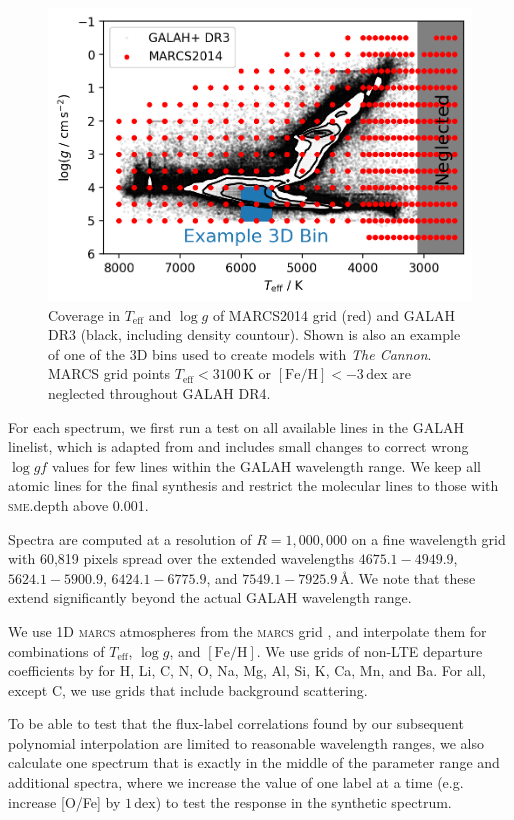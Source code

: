 \documentclass[
  journal=pasa,
  manuscript=research-paper, %
  year=2021,
  volume=37,
]{cup-journal}
\newcommand{\Teff}{$T_\mathrm{eff}$\xspace}
\newcommand{\logg}{$\log g$\xspace}
\newcommand{\feh}{$\mathrm{[Fe/H]}$\xspace}
\newcommand{\TheCannon}{\textit{The Cannon}\xspace}
\newcommand{\marcs}{\textsc{marcs}\xspace}
\newcommand{\dex}{\,\mathrm{dex}}	%
\newcommand{\K}{\,\mathrm{K}}	%
\newcommand{\Angstroem}{\,\text{\AA}}	%
\begin{document}
\begin{figure}[hbt!]
 \centering
 \includegraphics[width=\textwidth]{figures/teff_logg_grid_coverage.png}
 \caption{Coverage in \Teff and \logg of MARCS2014 grid (red) and GALAH DR3 (black, including density countour). Shown is also an example of one of the 3D bins used to create models with \TheCannon. MARCS grid points \Teff$ < 3100\K$ or \feh$<-3\dex$ are neglected throughout GALAH DR4.}
 \label{fig:teff_logg_grid_coverage}
\end{figure}

For each spectrum, we first run a test on all available lines in the GALAH linelist, which is adapted from \citet{Heiter2021} and includes small changes to correct wrong $\log gf$ values for few lines within the GALAH wavelength range. We keep all atomic lines for the final synthesis and restrict the molecular lines to those with \textsc{sme}.depth above 0.001.

Spectra are computed at a resolution of $R = 1,000,000$ on a fine wavelength grid with 60,819 pixels spread over the extended wavelengths $4675.1- 4949.9$, $5624.1-5900.9$, $6424.1-6775.9$, and $7549.1-7925.9 \Angstroem$. We note that these extend significantly beyond the actual GALAH wavelength range.

We use 1D \marcs atmospheres from the \marcs grid \citep[][version 2014]{Gustafsson2008}, and interpolate them for combinations of \Teff, \logg, and \feh. We use grids of non-LTE departure coefficients by \citet{Amarsi2020} for H, Li, C, N, O, Na, Mg, Al, Si, K, Ca, Mn, and Ba. For all, except C, we use grids that include background scattering.

To be able to test that the flux-label correlations found by our subsequent polynomial interpolation are limited to reasonable wavelength ranges, we also calculate one spectrum that is exactly in the middle of the parameter range and additional spectra, where we increase the value of one label at a time (e.g. increase [O/Fe] by $1\dex$) to test the response in the synthetic spectrum.
\end{document}
